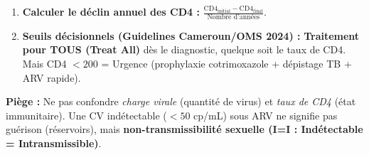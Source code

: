 \documentclass[11pt]{article}
\begin{document}
\begin{methode}
\begin{enumerate}
\begin{center}
\begin{tabularx}{\linewidth}{|l|X|X|X|}
    \end{tabularx}
    \end{center}
    \item \textbf{Calculer le déclin annuel des CD4 :} $\frac{\text{CD4}_{\text{initial}} - \text{CD4}_{\text{final}}}{\text{Nombre d'années}}$.
    \item \textbf{Seuils décisionnels (Guidelines Cameroun/OMS 2024) :} \textbf{Traitement pour TOUS (Treat All)} d\`es le diagnostic, quelque soit le taux de CD4. Mais CD4 $< 200$ = Urgence (prophylaxie cotrimoxazole + dépistage TB + ARV rapide).
\end{enumerate}
\textbf{Piège :} Ne pas confondre \emph{charge virale} (quantité de virus) et \emph{taux de CD4} (état immunitaire). Une CV indétectable ($< 50$ cp/mL) sous ARV ne signifie pas guérison (réservoirs), mais \textbf{non-transmissibilité sexuelle (I=I : Indétectable = Intransmissible)}.
\end{methode}
\end{document}
